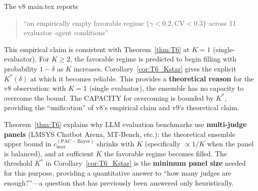 \begin{remark}
The v8 main.tex reports
\begin{quote}
``an empirically empty favorable regime $\{\gamma < 0.2, \mathrm{CV} < 0.3\}$
across 11 evaluator--agent conditions''
\end{quote}
This empirical claim is consistent with Theorem~\ref{thm:T6} at $K=1$
(single-evaluator). For $K \ge 2$, the favorable regime is predicted to begin
filling with probability $1-\delta$ as $K$ increases. Corollary~\ref{cor:T6_Kstar}
gives the explicit $K^*(\delta)$ at which it becomes reliable.
This provides a \textbf{theoretical reason} for the v8 observation: with
$K=1$ (single evaluator), the ensemble has no capacity to overcome the bound.
The CAPACITY for overcoming is bounded by $K^*$, providing the
``unification'' of v8's empirical claim and v9's theoretical claim.
\end{remark}

\begin{remark}
Theorem~\ref{thm:T6} explains why LLM evaluation benchmarks use
\textbf{multi-judge panels} (LMSYS Chatbot Arena, MT-Bench, etc.): the
theoretical ensemble upper bound in $c_{\max}^{(\mathrm{PAC-Bayes})}$ shrinks
with $K$ (specifically $\propto 1/K$ when the panel is balanced), and at
sufficient $K$ the favorable regime becomes filled. The threshold $K^*$ in
Corollary~\ref{cor:T6_Kstar} is the \textbf{minimum panel size} needed for
this purpose, providing a quantitative answer to ``how many judges are
enough?''---a question that has previously been answered only heuristically.
\end{remark}


%
%
